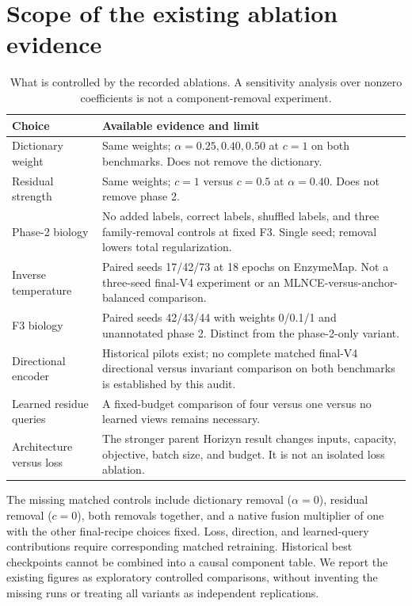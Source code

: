 \section{Scope of the existing ablation evidence}
\label{app:exp-coverage}

\begin{table}[htbp]
\centering\small
\caption{What is controlled by the recorded ablations. A sensitivity analysis
over nonzero coefficients is not a component-removal experiment.}
\label{tab:exp-coverage}
\begin{tabularx}{\linewidth}{p{.25\linewidth}X}
\toprule
Choice & Available evidence and limit\\\midrule
Dictionary weight & Same weights; $\alpha=0.25,0.40,0.50$ at $c=1$ on both benchmarks. Does not remove the dictionary.\\
Residual strength & Same weights; $c=1$ versus $c=0.5$ at $\alpha=0.40$. Does not remove phase 2.\\
Phase-2 biology & No added labels, correct labels, shuffled labels, and three family-removal controls at fixed F3. Single seed; removal lowers total regularization.\\
Inverse temperature & Paired seeds 17/42/73 at 18 epochs on EnzymeMap. Not a three-seed final-V4 experiment or an MLNCE-versus-anchor-balanced comparison.\\
F3 biology & Paired seeds 42/43/44 with weights 0/0.1/1 and unannotated phase 2. Distinct from the phase-2-only variant.\\
Directional encoder & Historical pilots exist; no complete matched final-V4 directional versus invariant comparison on both benchmarks is established by this audit.\\
Learned residue queries & A fixed-budget comparison of four versus one versus no learned views remains necessary.\\
Architecture versus loss & The stronger parent Horizyn result changes inputs, capacity, objective, batch size, and budget. It is not an isolated loss ablation.\\
\bottomrule
\end{tabularx}
\end{table}

The missing matched controls include dictionary removal ($\alpha=0$),
residual removal ($c=0$), both removals together, and a native fusion
multiplier of one with the other final-recipe choices fixed. Loss, direction,
and learned-query contributions require corresponding matched retraining.
Historical best checkpoints cannot be combined into a causal component table.
We report the existing figures as exploratory controlled comparisons, without
inventing the missing runs or treating all variants as independent replications.
\FloatBarrier

